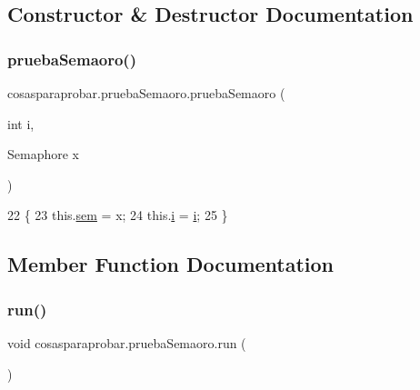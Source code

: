 \subsection{Constructor \& Destructor Documentation}
\mbox{\label{classcosasparaprobar_1_1prueba_semaoro_a73082d9634e3a14bcdc678355a0930ca}} 
\subsubsection{\texorpdfstring{prueba\+Semaoro()}{pruebaSemaoro()}}
{\footnotesize\ttfamily cosasparaprobar.\+prueba\+Semaoro.\+prueba\+Semaoro (\begin{DoxyParamCaption}\item[{int}]{i,  }\item[{Semaphore}]{x }\end{DoxyParamCaption})\hspace{0.3cm}{\ttfamily [inline]}}


\begin{DoxyCode}
22     \{
23         this.\mbox{\hyperlink{classcosasparaprobar_1_1prueba_semaoro_aff63c1c25145c5470c86f8b97fa93c81}{sem}} = x;
24         this.\mbox{\hyperlink{classcosasparaprobar_1_1prueba_semaoro_a9b8c78f7d8f806c59eef71f170426c0b}{i}} = \mbox{\hyperlink{classcosasparaprobar_1_1prueba_semaoro_a9b8c78f7d8f806c59eef71f170426c0b}{i}};
25     \}
\end{DoxyCode}


\subsection{Member Function Documentation}
\mbox{\label{classcosasparaprobar_1_1prueba_semaoro_ad522317dbe89134e39ce5c5e3cd06adc}} 
\subsubsection{\texorpdfstring{run()}{run()}}
{\footnotesize\ttfamily void cosasparaprobar.\+prueba\+Semaoro.\+run (\begin{DoxyParamCaption}{ }\end{DoxyParamCaption})\hspace{0.3cm}{\ttfamily [inline]}}



